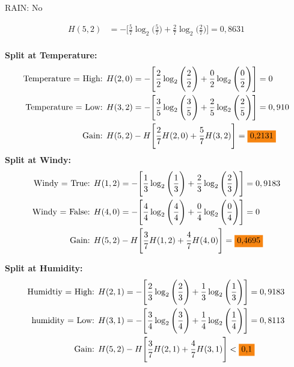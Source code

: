 \documentclass{article}
\begin{document}
RAIN: No

\begin{align*}
    H(5,2) &= -\Bigg[\frac{5}{7} \log_2\Bigg(\frac{5}{7}\Bigg) + \frac{2}{7} \log_2\Bigg(\frac{2}{7}\Bigg)\Bigg] = 0,8631\\
\end{align*}

\textbf{Split at Temperature:}
\begin{align*}
    \text{Temperature = High: } &H(2,0) = -\Bigg[\frac{2}{2} \log_2\Bigg(\frac{2}{2}\Bigg) + \frac{0}{2} \log_2\Bigg(\frac{0}{2}\Bigg)\Bigg] = 0\\
    \text{Temperature = Low: } &H(3,2) = -\Bigg[\frac{3}{5} \log_2\Bigg(\frac{3}{5}\Bigg) + \frac{2}{5} \log_2\Bigg(\frac{2}{5}\Bigg)\Bigg] = 0,910\\
    \text{Gain: } &H(5,2) - H\Bigg[\frac{2}{7} H(2,0) + \frac{5}{7} H(3,2)\Bigg] = \text{\colorbox{BurntOrange}{0,2131}}
\end{align*}
\textbf{Split at Windy:}
\begin{align*}
    \text{Windy = True: } &H(1,2) = -\Bigg[\frac{1}{3} \log_2\Bigg(\frac{1}{3}\Bigg) + \frac{2}{3} \log_2\Bigg(\frac{2}{3}\Bigg)\Bigg] = 0,9183\\
    \text{Windy = False: } &H(4,0) = -\Bigg[\frac{4}{4} \log_2\Bigg(\frac{4}{4}\Bigg) + \frac{0}{4} \log_2\Bigg(\frac{0}{4}\Bigg)\Bigg] = 0\\
    \text{Gain: } &H(5,2) - H\Bigg[\frac{3}{7} H(1,2) + \frac{4}{7} H(4,0)\Bigg] = \text{\colorbox{BurntOrange}{0,4695}}
\end{align*}

\textbf{Split at Humidity:}
\begin{align*}
    \text{Humidtiy = High: } &H(2,1) = -\Bigg[\frac{2}{3} \log_2\Bigg(\frac{2}{3}\Bigg) + \frac{1}{3} \log_2\Bigg(\frac{1}{3}\Bigg)\Bigg] = 0,9183\\
    \text{humidity = Low: } &H(3,1) = -\Bigg[\frac{3}{4} \log_2\Bigg(\frac{3}{4}\Bigg) + \frac{1}{4} \log_2\Bigg(\frac{1}{4}\Bigg)\Bigg] = 0,8113\\
    \text{Gain: } &H(5,2) - H\Bigg[\frac{3}{7} H(2,1) + \frac{4}{7} H(3,1)\Bigg] < \text{\colorbox{BurntOrange}{0,1}}
\end{align*}
\end{document}

